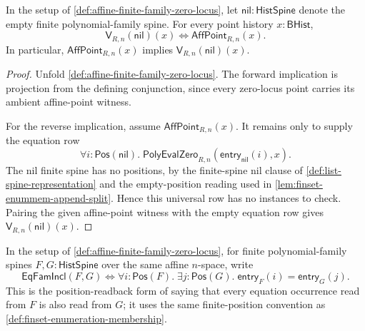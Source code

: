 \begin{theorem}
\label{thm:affine-empty-family-zero-locus-full-space}
In the setup of \autoref{def:affine-finite-family-zero-locus}, let $\mathsf{nil}:\mathsf{HistSpine}$ denote the empty finite polynomial-family spine. For every point history $x:\mathsf{BHist}$,
$$
\mathsf{V}_{R,n}(\mathsf{nil})(x)
\Longleftrightarrow
\mathsf{AffPoint}_{R,n}(x).
$$
In particular, $\mathsf{AffPoint}_{R,n}(x)$ implies $\mathsf{V}_{R,n}(\mathsf{nil})(x)$.
\end{theorem}
\begin{proof}
Unfold \autoref{def:affine-finite-family-zero-locus}. The forward implication is projection from the defining conjunction, since every zero-locus point carries its ambient affine-point witness.

For the reverse implication, assume $\mathsf{AffPoint}_{R,n}(x)$. It remains only to supply the equation row
$$
\forall i:\mathsf{Pos}(\mathsf{nil}).\;
\mathsf{PolyEvalZero}_{R,n}(\mathsf{entry}_{\mathsf{nil}}(i),x).
$$
The nil finite spine has no positions, by the finite-spine nil clause of \autoref{def:list-spine-representation} and the empty-position reading used in \autoref{lem:finset-enummem-append-split}. Hence this universal row has no instances to check. Pairing the given affine-point witness with the empty equation row gives $\mathsf{V}_{R,n}(\mathsf{nil})(x)$.
\end{proof}

\begin{definition}
\label{def:affine-finite-family-equation-inclusion}
In the setup of \autoref{def:affine-finite-family-zero-locus}, for finite polynomial-family spines $F,G:\mathsf{HistSpine}$ over the same affine $n$-space, write
$$
\mathsf{EqFamIncl}(F,G)
\Longleftrightarrow
\forall i:\mathsf{Pos}(F).\;
\exists j:\mathsf{Pos}(G).\;
\mathsf{entry}_{F}(i)=\mathsf{entry}_{G}(j).
$$
This is the position-readback form of saying that every equation occurrence read from $F$ is also read from $G$; it uses the same finite-position convention as \autoref{def:finset-enumeration-membership}.
\end{definition}

